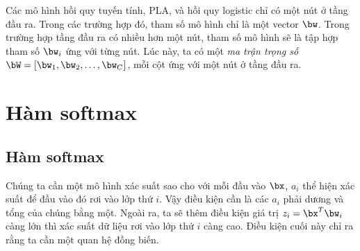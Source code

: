 


Các mô hình hồi quy tuyến tính, PLA, và hồi quy logistic chỉ có một nút ở tầng
đầu ra. Trong các trường hợp đó, tham số mô hình chỉ là một vector $\bw$.
Trong trường hợp tầng đầu ra có nhiều hơn một nút, tham số mô hình sẽ là tập hợp
tham số $\bw_i$ ứng với từng nút. Lúc này, ta có một \textit{ma trận
trọng số} $\bW = [\bw_1, \bw_2, \dots, \bw_C]$, mỗi
cột ứng với một nút ở tầng đầu ra.


\section{Hàm softmax}
\subsection{Hàm softmax}

Chúng ta cần một mô hình xác suất sao cho với mỗi đầu vào $\bx$, $a_i$ thể hiện
xác suất để đầu vào đó rơi vào lớp thứ $i$. Vậy điều kiện cần là các $a_i$ phải
dương và tổng của chúng bằng một. Ngoài ra, ta sẽ thêm điều kiện giá trị $z_i =
\bx^T\bw_i$ càng lớn thì xác suất dữ liệu rơi vào lớp thứ $i$ càng cao. Điều
kiện cuối này chỉ ra rằng ta cần một quan hệ đồng biến.

